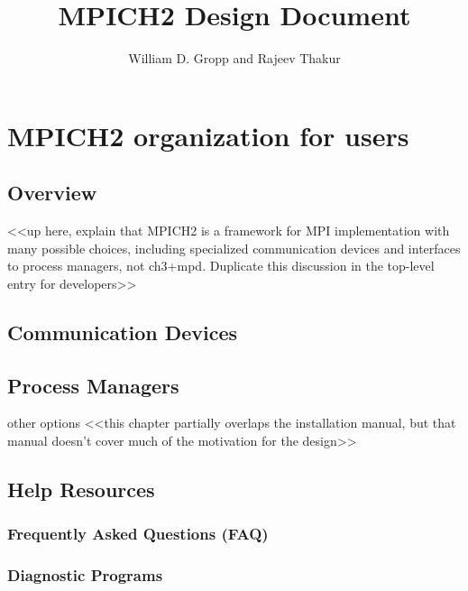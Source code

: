 \documentclass{report}
\begin{document}

\title{MPICH2 Design Document}
\author{William D. Gropp and Rajeev Thakur}
\maketitle

\tableofcontents
\clearpage



\pagestyle{headings}

\part{MPICH2 organization for users}

\chapter{Overview}
     <<up here, explain that MPICH2 is a framework for MPI implementation with many possible choices, including specialized communication devices and interfaces to process managers, not ch3+mpd.  Duplicate this discussion in the top-level entry for developers>>

\chapter{Communication Devices}

\chapter{Process Managers}

    other options 
    <<this chapter partially overlaps the installation manual, but that manual doesn't cover much of the motivation for the design>>

\chapter{Help Resources}

\section{Frequently Asked Questions (FAQ)}

\section{Diagnostic Programs}
\end{document}
